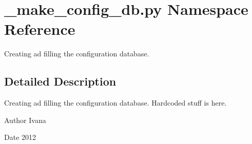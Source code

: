\hypertarget{namespace__make__config__db_1_1py}{\section{\-\_\-make\-\_\-config\-\_\-db.\-py Namespace Reference}
\label{namespace__make__config__db_1_1py}
}


Creating ad filling the configuration database.  




\subsection{Detailed Description}
Creating ad filling the configuration database. Hardcoded stuff is here. \begin{DoxyAuthor}{Author}
Ivana 
\end{DoxyAuthor}
\begin{DoxyDate}{Date}
2012 
\end{DoxyDate}
